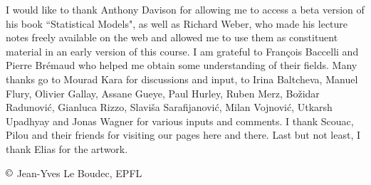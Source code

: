 I would like to thank Anthony Davison
for allowing me to access a beta version of his
book ``Statistical Models", as well as Richard Weber, who made his lecture notes
freely available on the web and allowed me to use
them as constituent material in an early version
of this course. I am grateful to Fran\c{c}ois
Baccelli and Pierre Br\'{e}maud
who helped me obtain some understanding of their fields. Many
thanks go to Mourad Kara for discussions and input, to
 Irina Baltcheva,
 Manuel Flury,
 Olivier Gallay,
 Assane Gueye,
 Paul Hurley,
 Ruben Merz,
 Bo\v{z}idar Radunovi\'{c},
 Gianluca Rizzo,
 Slavi\v{s}a Sarafijanovi\'{c},
 Milan Vojnovi\'{c},
 Utkarsh Upadhyay
 and
 Jonas Wagner
for various inputs and comments. I thank Scouac, Pilou and
their friends for visiting our pages here and there. Last but
not least, I thank Elias for the artwork.

\vfill $\copyright$ Jean-Yves Le Boudec, EPFL
